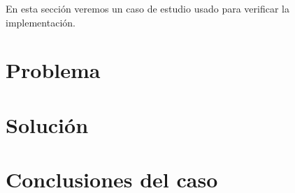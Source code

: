 
  En esta sección veremos un caso de estudio usado para verificar la
implementación.

\section {Problema}

\section {Solución}

\section {Conclusiones del caso}



